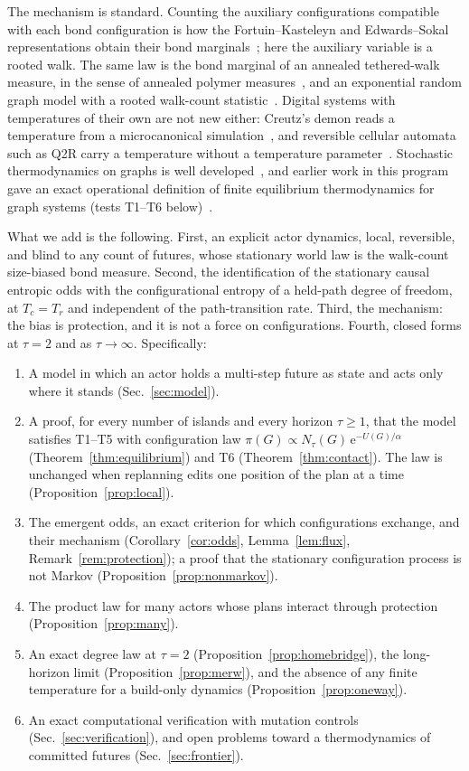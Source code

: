 \documentclass[aps,pre,preprint,superscriptaddress,nofootinbib]{revtex4-2}
\theoremstyle{definition}
\theoremstyle{remark}
\newcommand{\N}{N_\tau}
\newcommand{\e}{\mathrm{e}}
\begin{document}
The mechanism is standard. Counting the auxiliary configurations compatible with each bond configuration is how the Fortuin--Kasteleyn and Edwards--Sokal representations obtain their bond marginals~\cite{FortuinKasteleyn1972,EdwardsSokal1988}; here the auxiliary variable is a rooted walk. The same law is the bond marginal of an annealed tethered-walk measure, in the sense of annealed polymer measures~\cite{Comets2017}, and an exponential random graph model with a rooted walk-count statistic~\cite{ParkNewman2004,FrankStrauss1986}. Digital systems with temperatures of their own are not new either: Creutz's demon reads a temperature from a microcanonical simulation~\cite{Creutz1983}, and reversible cellular automata such as Q2R carry a temperature without a temperature parameter~\cite{Pomeau1984,Vichniac1984}. Stochastic thermodynamics on graphs is well developed~\cite{Schnakenberg1976,Seifert2012,Maes2021}, and earlier work in this program gave an exact operational definition of finite equilibrium thermodynamics for graph systems (tests T1--T6 below)~\cite{CALXTHERM}.

What we add is the following. First, an explicit actor dynamics, local, reversible, and blind to any count of futures, whose stationary world law is the walk-count size-biased bond measure. Second, the identification of the stationary causal entropic odds with the configurational entropy of a held-path degree of freedom, at $T_c=T_r$ and independent of the path-transition rate. Third, the mechanism: the bias is protection, and it is not a force on configurations. Fourth, closed forms at $\tau=2$ and as $\tau\to\infty$. Specifically:
\begin{enumerate}
\item A model in which an actor holds a multi-step future as state and acts only where it stands (Sec.~\ref{sec:model}).
\item A proof, for every number of islands and every horizon $\tau\ge1$, that the model satisfies T1--T5 with configuration law $\pi(G)\propto\N(G)\,\e^{-U(G)/\alpha}$ (Theorem~\ref{thm:equilibrium}) and T6 (Theorem~\ref{thm:contact}). The law is unchanged when replanning edits one position of the plan at a time (Proposition~\ref{prop:local}).
\item The emergent odds, an exact criterion for which configurations exchange, and their mechanism (Corollary~\ref{cor:odds}, Lemma~\ref{lem:flux}, Remark~\ref{rem:protection}); a proof that the stationary configuration process is not Markov (Proposition~\ref{prop:nonmarkov}).
\item The product law for many actors whose plans interact through protection (Proposition~\ref{prop:many}).
\item An exact degree law at $\tau=2$ (Proposition~\ref{prop:homebridge}), the long-horizon limit (Proposition~\ref{prop:merw}), and the absence of any finite temperature for a build-only dynamics (Proposition~\ref{prop:oneway}).
\item An exact computational verification with mutation controls (Sec.~\ref{sec:verification}), and open problems toward a thermodynamics of committed futures (Sec.~\ref{sec:frontier}).
\end{enumerate}
\end{document}
